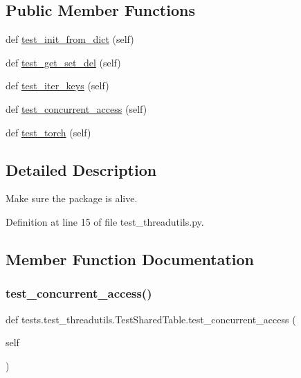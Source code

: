 \subsection*{Public Member Functions}
\begin{DoxyCompactItemize}
\item 
def \hyperlink{classtests_1_1test__threadutils_1_1TestSharedTable_a877c1284bd99fe9f44c4b744b4bae9d8}{test\+\_\+init\+\_\+from\+\_\+dict} (self)
\item 
def \hyperlink{classtests_1_1test__threadutils_1_1TestSharedTable_a5afcb2be145212a9d06f2f2ecd45da68}{test\+\_\+get\+\_\+set\+\_\+del} (self)
\item 
def \hyperlink{classtests_1_1test__threadutils_1_1TestSharedTable_ad83a5fe7bed1811264f41406c3ec8976}{test\+\_\+iter\+\_\+keys} (self)
\item 
def \hyperlink{classtests_1_1test__threadutils_1_1TestSharedTable_ad8ca4e7c8fbc4e8ddb170158fe01c861}{test\+\_\+concurrent\+\_\+access} (self)
\item 
def \hyperlink{classtests_1_1test__threadutils_1_1TestSharedTable_a44071985cd8526645fb0f2c41fddbff9}{test\+\_\+torch} (self)
\end{DoxyCompactItemize}


\subsection{Detailed Description}
\begin{DoxyVerb}Make sure the package is alive.\end{DoxyVerb}
 

Definition at line 15 of file test\+\_\+threadutils.\+py.



\subsection{Member Function Documentation}
\mbox{\label{classtests_1_1test__threadutils_1_1TestSharedTable_ad8ca4e7c8fbc4e8ddb170158fe01c861}} 
\subsubsection{\texorpdfstring{test\+\_\+concurrent\+\_\+access()}{test\_concurrent\_access()}}
{\footnotesize\ttfamily def tests.\+test\+\_\+threadutils.\+Test\+Shared\+Table.\+test\+\_\+concurrent\+\_\+access (\begin{DoxyParamCaption}\item[{}]{self }\end{DoxyParamCaption})}



